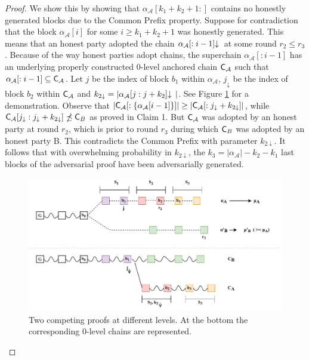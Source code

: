 \begin{proof}
	\noindent
	We show this by showing that $\alpha_\mathcal{A}[k_1 + k_2 + 1:]$ contains no honestly generated
	blocks due to the Common Prefix property. Suppose for contradiction that the block $\alpha_\mathcal{A}[i]$ for some $i \geq k_1 +
	k_2 + 1$ was honestly generated. This means that an honest party adopted the chain
	$\alpha_\mathcal{A}[:i - 1]\negthickspace\downarrow\,$ at some round $r_2 \leq r_3$. Because of the way honest
	parties adopt chains, the superchain $\alpha_\mathcal{A}[:i - 1]$ has an underlying properly
	constructed 0-level anchored chain $\mathsf{C}_\mathcal{A}$ such that $\alpha_\mathcal{A}[:i - 1] \subseteq \mathsf{C}_\mathcal{A}$.
	Let $j$ be the index of block $b_1$ within $\alpha_\mathcal{A}$, $j_\downarrow$ be the index
	of block $b_2$ within $\mathsf{C}_\mathcal{A}$ and $k_{2\downarrow} = \vert \alpha_\mathcal{A}[j:j+k_2]\negthickspace\downarrow\,\vert$.
	See Figure \ref{fig:proof} for a demonstration. Observe that $\vert \mathsf{C}_\mathcal{A}[:\{\alpha_\mathcal{A}[i-1]\}]
	\vert \geq \vert \mathsf{C}_\mathcal{A}[:{j_\downarrow}+k_{2\downarrow}] \vert$, while
	$\mathsf{C}_\mathcal{A}[j_\downarrow:j_\downarrow + k_{2\downarrow}] \npreceq \mathsf{C}_B$ as proved in
	Claim 1. But $\mathsf{C}_\mathcal{A}$ was adopted by an honest party at round $r_2$, which is prior
	to round $r_3$ during which $\mathsf{C}_B$ was adopted by an honest party B. This 
	contradicts the Common Prefix\cite{backbone} with parameter $k_{2\downarrow}$. It follows that with overwhelming probability in $k_{2\downarrow}$, the 
	$k_3 = \vert \alpha_\mathcal{A} \vert - k_2 - k_1$ last blocks of the adversarial proof have been adversarially generated.\\

	\begin{figure}[h]
		\begin{center}
			\includegraphics[width=\columnwidth]{figures/proof.pdf}
		\end{center}
		\caption{Two competing proofs at different levels. At the bottom the
		corresponding 0-level chains are represented.}
		\label{fig:proof}
	\end{figure}


\end{proof}
